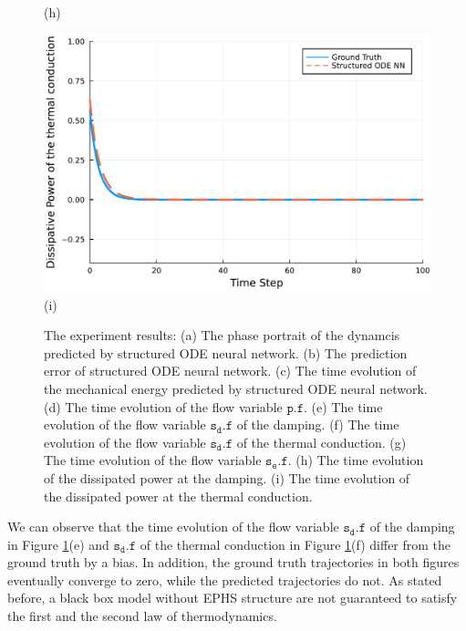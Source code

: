 \documentclass[
	parskip, 			   %
	twoside, 			   %
	DIV=14, 			   %
	BCOR=15.0mm, 		   %
	headsepline, 		   %
	open=right, 		   %
	captions=tableheading, %
	bibliography=totoc,    %
	numbers=noenddot       %
]{scrreprt}
\begin{document}
\begin{figure}[h!]
\begin{minipage}{.3\textwidth}
    \\(h)
    \end{minipage}%
    \begin{minipage}{.3\textwidth}
    \centering
    \includegraphics[width=1\linewidth]{figures/dissipative_power_thermal_conduction_ndho.pdf}
    \\(i)
    \end{minipage}
    \caption{The experiment results: (a) The phase portrait of the dynamcis predicted by structured ODE neural network. (b) The prediction error of structured ODE neural network. (c) The time evolution of the mechanical energy predicted by structured ODE neural network. (d) The time evolution of the flow variable $\mathtt{p.f}$. (e) The time evolution of the flow variable $\mathtt{s_{d}.f}$ of the damping. (f) The time evolution of the flow variable $\mathtt{s_{d}.f}$ of the thermal conduction. (g) The time evolution of the flow variable $\mathtt{s_e.f}$. (h) The time evolution of the dissipated power at the damping. (i) The time evolution of the dissipated power at the thermal conduction.}
    \label{fig:ndho_experiment}
\end{figure}

We can observe that the time evolution of the flow variable $\mathtt{s_{d}.f}$ of the damping in Figure \ref{fig:ndho_experiment}(e) and $\mathtt{s_{d}.f}$ of the thermal conduction in Figure \ref{fig:ndho_experiment}(f) differ from the ground truth by a bias. In addition, the ground truth trajectories in both figures eventually converge to zero, while the predicted trajectories do not. As stated before, a black box model without EPHS structure are not guaranteed to satisfy the first and the second law of thermodynamics. 
\end{document}

